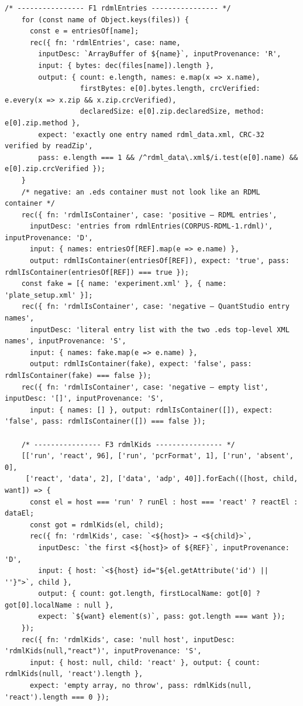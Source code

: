 \begin{lstlisting}[style=js]
    /* ---------------- F1 rdmlEntries ---------------- */
    for (const name of Object.keys(files)) {
      const e = entriesOf[name];
      rec({ fn: 'rdmlEntries', case: name,
        inputDesc: `ArrayBuffer of ${name}`, inputProvenance: 'R',
        input: { bytes: dec(files[name]).length },
        output: { count: e.length, names: e.map(x => x.name),
                  firstBytes: e[0].bytes.length, crcVerified: e.every(x => x.zip && x.zip.crcVerified),
                  declaredSize: e[0].zip.declaredSize, method: e[0].zip.method },
        expect: 'exactly one entry named rdml_data.xml, CRC-32 verified by readZip',
        pass: e.length === 1 && /^rdml_data\.xml$/i.test(e[0].name) && e[0].zip.crcVerified });
    }
    /* negative: an .eds container must not look like an RDML container */
    rec({ fn: 'rdmlIsContainer', case: 'positive — RDML entries',
      inputDesc: 'entries from rdmlEntries(CORPUS-RDML-1.rdml)', inputProvenance: 'D',
      input: { names: entriesOf[REF].map(e => e.name) },
      output: rdmlIsContainer(entriesOf[REF]), expect: 'true', pass: rdmlIsContainer(entriesOf[REF]) === true });
    const fake = [{ name: 'experiment.xml' }, { name: 'plate_setup.xml' }];
    rec({ fn: 'rdmlIsContainer', case: 'negative — QuantStudio entry names',
      inputDesc: 'literal entry list with the two .eds top-level XML names', inputProvenance: 'S',
      input: { names: fake.map(e => e.name) },
      output: rdmlIsContainer(fake), expect: 'false', pass: rdmlIsContainer(fake) === false });
    rec({ fn: 'rdmlIsContainer', case: 'negative — empty list', inputDesc: '[]', inputProvenance: 'S',
      input: { names: [] }, output: rdmlIsContainer([]), expect: 'false', pass: rdmlIsContainer([]) === false });

    /* ---------------- F3 rdmlKids ---------------- */
    [['run', 'react', 96], ['run', 'pcrFormat', 1], ['run', 'absent', 0],
     ['react', 'data', 2], ['data', 'adp', 40]].forEach(([host, child, want]) => {
      const el = host === 'run' ? runEl : host === 'react' ? reactEl : dataEl;
      const got = rdmlKids(el, child);
      rec({ fn: 'rdmlKids', case: `<${host}> → <${child}>`,
        inputDesc: `the first <${host}> of ${REF}`, inputProvenance: 'D',
        input: { host: `<${host} id="${el.getAttribute('id') || ''}">`, child },
        output: { count: got.length, firstLocalName: got[0] ? got[0].localName : null },
        expect: `${want} element(s)`, pass: got.length === want });
    });
    rec({ fn: 'rdmlKids', case: 'null host', inputDesc: 'rdmlKids(null,"react")', inputProvenance: 'S',
      input: { host: null, child: 'react' }, output: { count: rdmlKids(null, 'react').length },
      expect: 'empty array, no throw', pass: rdmlKids(null, 'react').length === 0 });


\end{lstlisting}
